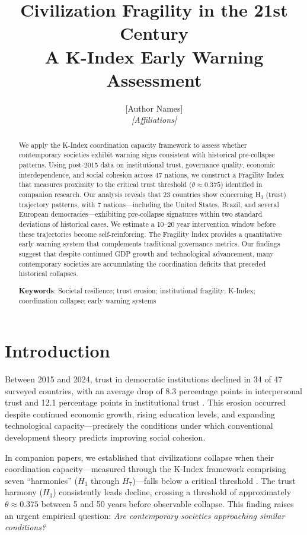\documentclass[11pt,a4paper]{article}
\title{\textbf{Civilization Fragility in the 21st Century}\\[0.5em]
\large A K-Index Early Warning Assessment}
\author{[Author Names]\\
\textit{[Affiliations]}}
\date{}
\begin{document}
\maketitle

\begin{abstract}
We apply the K-Index coordination capacity framework to assess whether contemporary societies exhibit warning signs consistent with historical pre-collapse patterns. Using post-2015 data on institutional trust, governance quality, economic interdependence, and social cohesion across 47 nations, we construct a Fragility Index that measures proximity to the critical trust threshold ($\theta \approx 0.375$) identified in companion research. Our analysis reveals that 23 countries show concerning H$_3$ (trust) trajectory patterns, with 7 nations---including the United States, Brazil, and several European democracies---exhibiting pre-collapse signatures within two standard deviations of historical cases. We estimate a 10--20 year intervention window before these trajectories become self-reinforcing. The Fragility Index provides a quantitative early warning system that complements traditional governance metrics. Our findings suggest that despite continued GDP growth and technological advancement, many contemporary societies are accumulating the coordination deficits that preceded historical collapses.

\textbf{Keywords}: Societal resilience; trust erosion; institutional fragility; K-Index; coordination collapse; early warning systems
\end{abstract}

\section{Introduction}

Between 2015 and 2024, trust in democratic institutions declined in 34 of 47 surveyed countries, with an average drop of 8.3 percentage points in interpersonal trust and 12.1 percentage points in institutional trust \citep{WVS2024, Edelman2024}. This erosion occurred despite continued economic growth, rising education levels, and expanding technological capacity---precisely the conditions under which conventional development theory predicts improving social cohesion.

In companion papers, we established that civilizations collapse when their coordination capacity---measured through the K-Index framework comprising seven ``harmonies'' ($H_1$ through $H_7$)---falls below a critical threshold \citep{Paper1, Paper2}. The trust harmony ($H_3$) consistently leads decline, crossing a threshold of approximately $\theta \approx 0.375$ between 5 and 50 years before observable collapse. This finding raises an urgent empirical question: \textit{Are contemporary societies approaching similar conditions?}
\end{document}
